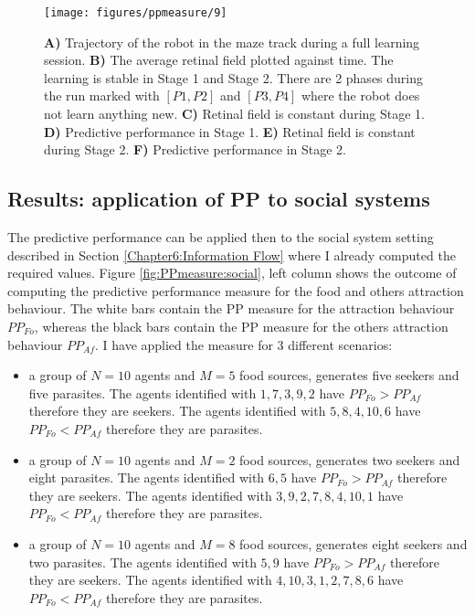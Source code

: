 \begin{figure}[!hbt]
	\begin{center}
		\texttt{[image: figures/ppmeasure/9]}
	\end{center}
	\caption[Full learning robot on the maze track]{
	{\bf A)} Trajectory of the robot in the maze track during a full learning session.
	{\bf B)} The average retinal field plotted against time. The learning is stable in Stage 1 and Stage 2.
There are 2 phases during the run marked with $[P1,P2]$ and $[P3,P4]$ where the robot does not learn
anything new.
	{\bf C)} Retinal field is constant during Stage 1.
	{\bf D)} Predictive performance in Stage 1. 
	{\bf E)} Retinal field is constant during Stage 2.
	{\bf F)} Predictive performance in Stage 2. 
	\label{PPmeasure:MazeFinalLearning}
	}
\end{figure}

\subsection{Results: application of PP to social systems}
\label{Chapter8:PPsocial}
The predictive performance can be applied then to the social system
setting described in Section \ref{Chapter6:Information Flow} where
I already computed the required values.
Figure \ref{fig:PPmeasure:social}, left column shows the outcome of computing the predictive
performance measure for the food and others attraction behaviour.
The white bars contain the PP measure for the attraction behaviour $PP_{Fo}$, whereas
the black bars contain the PP measure for the others attraction behaviour $PP_{Af}$.
I have applied the measure for 3 different scenarios:
\begin{itemize}
 \item a group of $N=10$ agents and $M=5$ food sources, generates five seekers and five parasites.
The agents identified with $1,7,3,9,2$ have $PP_{Fo}> PP_{Af}$ therefore they are
seekers.
The agents identified with $5,8,4,10,6$ have $PP_{Fo}< PP_{Af}$ therefore they are
parasites.
 \item a group of $N=10$ agents and $M=2$ food sources, generates two seekers and eight parasites.
The agents identified with $6,5$ have $PP_{Fo}> PP_{Af}$ therefore they are
seekers.
The agents identified with $3,9,2,7,8,4,10,1$ have $PP_{Fo}< PP_{Af}$ therefore they are
parasites.
 \item a group of $N=10$ agents and $M=8$ food sources, generates eight seekers and two parasites.
The agents identified with $5,9$ have $PP_{Fo}> PP_{Af}$ therefore they are
seekers.
The agents identified with $4,10,3,1,2,7,8,6$ have $PP_{Fo}< PP_{Af}$ therefore they are
parasites.
\end{itemize}

